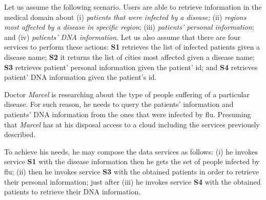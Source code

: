 %

Let us assume the following scenario. Users are able to retrieve information  in
the medical domain about (i) \textit{patients that were infected by a disease;}
(ii) \textit{regions most affected by a disease in specific region}; (iii)
\textit{patients' personal information}; and (iv) \textit{patients' DNA
information}.
Let us also assume that there are four services to perform these actions:
\textbf{S1} retrieves the list of infected patients given a disease name; 
\textbf{S2} it returns the list of cities most affected given a disease name; 
\textbf{S3} retrieves patient' personal information given the patient' id; and 
\textbf{S4} retrieves patient' DNA information given the patient's id.


Doctor \textit{Marcel} is researching about the type of people suffering of a
particular disease. For such reason, he needs to query the patients'
information and patients' DNA information from the ones that were infected by
flu. Presuming that \textit{Marcel} has at his disposal access to a cloud
including the services previously described. 

To achieve his needs, he may
compose the data services as follows:
(i) he invokes service \textbf{S1} with the disease information then he gets the set of people infected by flu; 
(ii) then he invokes service \textbf{S3} with the obtained patients in order to retrieve their personal information; 
just after (iii) he invokes service \textbf{S4} with the obtained patients to
retrieve their DNA information.


